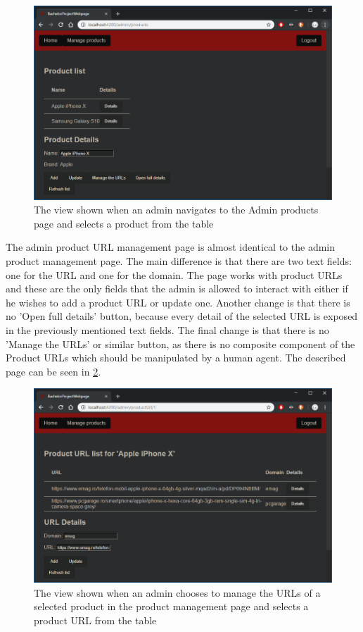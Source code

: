 \documentclass[12pt,a4paper,twoside]{report}
\begin{document}
\begin{figure}[ht]
  \centering
  \includegraphics[width=0.75\linewidth]{img/web_page_admin_products.png}
  \caption[]{The view shown when an admin navigates to the Admin products page and selects a product from the table}
  \label{fig:web_page_admin_products}
\end{figure}

The admin product URL management page is almost identical to the admin product management page. The main difference is that there are two text fields: one for the URL and one for the domain. The page works with product URLs and these are the only fields that the admin is allowed to interact with either if he wishes to add a product URL or update one. Another change is that there is no 'Open full details' button, because every detail of the selected URL is exposed in the previously mentioned text fields. The final change is that there is no 'Manage the URLs' or similar button, as there is no composite component of the Product URLs which should be manipulated by a human agent. The described page can be seen in \ref{fig:web_page_admin_product_urls}.

\begin{figure}[ht]
  \centering
  \includegraphics[width=0.75\linewidth]{img/web_page_admin_product_urls.png}
  \caption[]{The view shown when an admin chooses to manage the URLs of a selected product in the product management page and selects a product URL from the table}
  \label{fig:web_page_admin_product_urls}
\end{figure}
\end{document}
